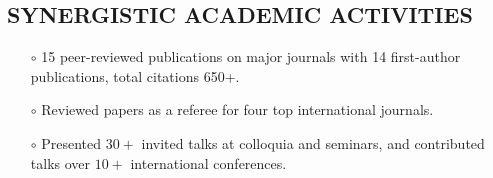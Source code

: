 \documentclass[10pt]{res}
\newcommand{\blockline}{\noindent\hspace{-0.03\textwidth}
{\rule{1.03\textwidth}{0.8pt}}}
\begin{document}
\begin{resume}


\section{\large SYNERGISTIC ACADEMIC ACTIVITIES}
\vspace{-0.2cm}
\noindent{\blockline}
\begin{itemize} [leftmargin=0.0cm]
 \item[$\circ$] 15 peer-reviewed publications on major journals with 14 first-author publications, total citations 650+. 
 \item[$\circ$] Reviewed papers as a referee for four top international journals. 
 \item[$\circ$] Presented $30+$ invited talks at colloquia and seminars, and contributed talks over $10+$ international conferences.
\end{itemize} 

\end{resume}
\end{document}
